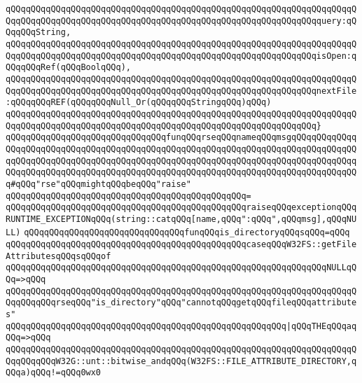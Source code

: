 \verb|qQQqqQQqqQQqqQQqqQQqqQQqqQQqqQQqqQQqqQQqqQQqqQQqqQQqqQQqqQQqqQQqqQQqqQQqqQQqqQQqqQQqqQQqqQQqqQQqqQQqqQQqqQQqqQQqqQQqqQQqqQQqqQQqqQQqquery:qQQqqQQqString,|\newline
\verb|qQQqqQQqqQQqqQQqqQQqqQQqqQQqqQQqqQQqqQQqqQQqqQQqqQQqqQQqqQQqqQQqqQQqqQQqqQQqqQQqqQQqqQQqqQQqqQQqqQQqqQQqqQQqqQQqqQQqqQQqqQQqqQQqqQQqisOpen:qQQqqQQqRef(qQQqBoolqQQq),|\newline
\verb|qQQqqQQqqQQqqQQqqQQqqQQqqQQqqQQqqQQqqQQqqQQqqQQqqQQqqQQqqQQqqQQqqQQqqQQqqQQqqQQqqQQqqQQqqQQqqQQqqQQqqQQqqQQqqQQqqQQqqQQqqQQqqQQqqQQqnextFile:qQQqqQQqREF(qQQqqQQqNull_Or(qQQqqQQqStringqQQq)qQQq)|\newline
\verb|qQQqqQQqqQQqqQQqqQQqqQQqqQQqqQQqqQQqqQQqqQQqqQQqqQQqqQQqqQQqqQQqqQQqqQQqqQQqqQQqqQQqqQQqqQQqqQQqqQQqqQQqqQQqqQQqqQQqqQQqqQQqqQQqqQQq}|\newline
\newline
\verb|qQQqqQQqqQQqqQQqqQQqqQQqqQQqqQQqfunqQQqrseqQQqnameqQQqmsgqQQqqQQqqQQqqQQqqQQqqQQqqQQqqQQqqQQqqQQqqQQqqQQqqQQqqQQqqQQqqQQqqQQqqQQqqQQqqQQqqQQqqQQqqQQqqQQqqQQqqQQqqQQqqQQqqQQqqQQqqQQqqQQqqQQqqQQqqQQqqQQqqQQqqQQqqQQqqQQqqQQqqQQqqQQqqQQqqQQqqQQqqQQqqQQqqQQqqQQqqQQqqQQqqQQqqQQqqQQqqQQq#qQQq"rse"qQQqmightqQQqbeqQQq"raise"|\newline
\verb|qQQqqQQqqQQqqQQqqQQqqQQqqQQqqQQqqQQqqQQqqQQqqQQq=|\newline
\verb|qQQqqQQqqQQqqQQqqQQqqQQqqQQqqQQqqQQqqQQqqQQqqQQqraiseqQQqexceptionqQQqRUNTIME_EXCEPTIONqQQq(string::catqQQq[name,qQQq":qQQq",qQQqmsg],qQQqNULL)|\newline
\newline
\verb|qQQqqQQqqQQqqQQqqQQqqQQqqQQqqQQqfunqQQqis_directoryqQQqsqQQq=qQQq|\newline
\verb|qQQqqQQqqQQqqQQqqQQqqQQqqQQqqQQqqQQqqQQqqQQqqQQqcaseqQQqW32FS::getFileAttributesqQQqsqQQqof|\newline
\verb|qQQqqQQqqQQqqQQqqQQqqQQqqQQqqQQqqQQqqQQqqQQqqQQqqQQqqQQqqQQqqQQqNULLqQQq=>qQQq|\newline
\verb|qQQqqQQqqQQqqQQqqQQqqQQqqQQqqQQqqQQqqQQqqQQqqQQqqQQqqQQqqQQqqQQqqQQqqQQqqQQqqQQqrseqQQq"is_directory"qQQq"cannotqQQqgetqQQqfileqQQqattributes"|\newline
\verb|qQQqqQQqqQQqqQQqqQQqqQQqqQQqqQQqqQQqqQQqqQQqqQQqqQQqqQQq|\verb#|qQQqTHEqQQqaqQQq=>qQQq#\newline
\verb|qQQqqQQqqQQqqQQqqQQqqQQqqQQqqQQqqQQqqQQqqQQqqQQqqQQqqQQqqQQqqQQqqQQqqQQqqQQqqQQqW32G::unt::bitwise_andqQQq(W32FS::FILE_ATTRIBUTE_DIRECTORY,qQQqa)qQQq!=qQQq0wx0|\newline
